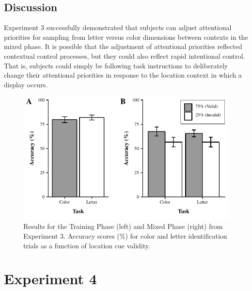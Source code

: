 \documentclass[english,,man,floatsintext]{apa6}
\begin{document}
\subsection{Discussion}\label{discussion-2}

Experiment 3 successfully demonstrated that subjects can adjust
attentional priorities for sampling from letter versus color dimensions
between contexts in the mixed phase. It is possible that the adjustment
of attentional priorities reflected contextual control processes, but
they could also reflect rapid intentional control. That is, subjects
could simply be following task instructions to deliberately change their
attentional priorities in response to the location context in which a
display occurs.

\begin{figure}
\centering
\includegraphics{figures/IC-figure4.pdf}
\caption{\label{fig:figure4}Results for the Training Phase (left) and Mixed Phase
(right) from Experiment 3. Accuracy scores (\%) for color and letter
identification trials as a function of location cue validity.}
\end{figure}





\section{Experiment 4}\label{experiment-4}
\end{document}
